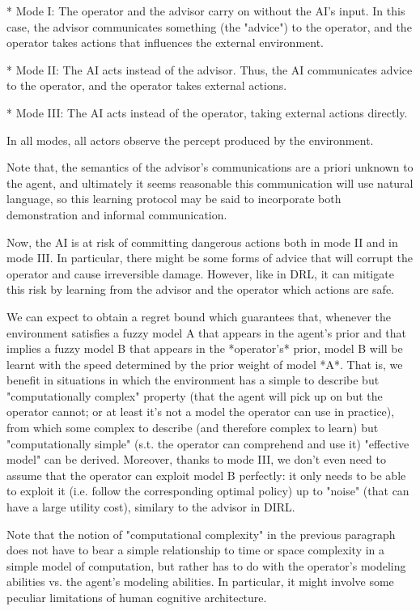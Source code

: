 \documentclass[a4paper]{article}
\begin{document}
* Mode I: The operator and the advisor carry on without the AI's input. In this case, the advisor communicates something (the "advice") to the operator, and the operator takes actions that influences the external environment.

* Mode II: The AI acts instead of the advisor. Thus, the AI communicates advice to the operator, and the operator takes external actions.

* Mode III: The AI acts instead of the operator, taking external actions directly.

In all modes, all actors observe the percept produced by the environment.

Note that, the semantics of the advisor's communications are a priori unknown to the agent, and ultimately it seems reasonable this communication will use natural language, so this learning protocol may be said to incorporate both demonstration and informal communication.

Now, the AI is at risk of committing dangerous actions both in mode II and in mode III. In particular, there might be some forms of advice that will corrupt the operator and cause irreversible damage. However, like in DRL, it can mitigate this risk by learning from the advisor and the operator which actions are safe.

We can expect to obtain a regret bound which guarantees that, whenever the environment satisfies a fuzzy model A that appears in the agent's prior and that implies a fuzzy model B that appears in the *operator's* prior, model B will be learnt with the speed determined by the prior weight of model *A*. That is, we benefit in situations in which the environment has a simple to describe but "computationally complex" property (that the agent will pick up on but the operator cannot; or at least it's not a model the operator can use in practice), from which some complex to describe (and therefore complex to learn) but "computationally simple" (s.t. the operator can comprehend and use it) "effective model" can be derived. Moreover, thanks to mode III, we don't even need to assume that the operator can exploit model B perfectly: it only needs to be able to exploit it (i.e. follow the corresponding optimal policy) up to "noise" (that can have a large utility cost), similary to the advisor in DIRL.

Note that the notion of "computational complexity" in the previous paragraph does not have to bear a simple relationship to time or space complexity in a simple model of computation, but rather has to do with the operator's modeling abilities vs. the agent's modeling abilities. In particular, it might involve some peculiar limitations of human cognitive architecture.
\end{document}

